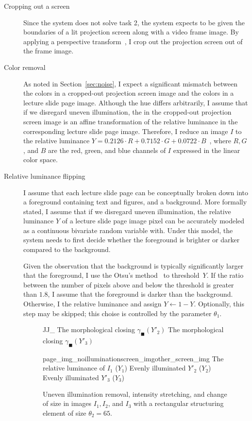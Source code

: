\begin{description}
  \item[Cropping out a screen]
    Since the system does not solve task 2, the system expects to be given the
    boundaries of a lit projection screen along with a video frame image. By
    applying a perspective transform~\cite[sec.~2]{eberly11}, I crop out the
    projection screen out of the frame image.
  \item[Color removal]
    As noted in Section~\ref{sec:noise}, I expect a significant mismatch
    between the colors in a cropped-out projection screen image and the colors
    in a lecture slide page image. Although the hue differs arbitrarily, I
    assume that if we disregard uneven illumination, the  in the cropped-out projection screen image is an affine
    transformation of the relative luminance in the corresponding lecture slide
    page image. Therefore, I reduce an image $I$ to the relative luminance
    $Y=0.2126\cdot R+0.7152\cdot G+0.0722\cdot B$~\cite[part~2]{stokesetal96},
    where $R,G$, and $B$ are the red, green, and blue channels of $I$ expressed
    in the linear  color space.
  \item[Relative luminance flipping]
    I assume that each lecture slide page can be conceptually broken down into
    a foreground containing text and figures, and a background.
    More formally stated, I assume that if we disregard uneven illumination,
    the relative luminance $Y$ of a lecture slide page image pixel can be
    accurately modeled as a continuous bivariate random variable with. Under
    this model, the system needs to first decide whether the foreground is
    brighter or darker compared to the background.
    
    Given the observation that the background is typically significantly
    larger that the foreground, I use the Otsu's
    method~\cite{otsu1979threshold} to threshold~$Y$. If the ratio between the
    number of pixels above and below the threshold is greater than $1.8$, I
    assume that the foreground is darker than the background. Otherwise, I
     the relative luminance and assign $Y\leftarrow1-Y$.
    Optionally, this step may be skipped; this choise is controlled by the
    parameter $\theta_1$.

  \begin{figure}
      {J}{J_}%
      {The morphological closing $\gamma_\blacksquare(Y'_2)$}%
      {The morphological closing $\gamma_\blacksquare(Y'_3)$}\par
      {page_img_noillumination}{screen_img}{other_screen_img}%
      {The relative luminance of $I_1$ ($Y_1$)}%
      {Evenly illuminated $Y'_2$ ($Y_2$)}%
      {Evenly illuminated $Y'_3$ ($Y_3$)}
    \caption{Uneven illumination removal, intensity stretching, and change of
      size in images $I_1,I_2$, and $I_3$ with a rectangular structuring
      element of size $\theta_2 = 65$.}


\end{figure}
\end{description}
